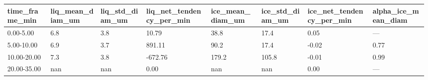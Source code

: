 \begin{tabular}{llllllll}
\toprule
time_frame_min & liq_mean_diam_um & liq_std_diam_um & liq_net_tendency_per_min & ice_mean_diam_um & ice_std_diam_um & ice_net_tendency_per_min & alpha_ice_mean_diam \\
\midrule
0.00-5.00 & 6.8 & 3.8 & 10.79 & 38.8 & 17.4 & 0.05 & — \\
5.00-10.00 & 6.9 & 3.7 & 891.11 & 90.2 & 17.4 & -0.02 & 0.77 \\
10.00-20.00 & 7.3 & 3.8 & -672.76 & 179.2 & 105.8 & -0.01 & 0.99 \\
20.00-35.00 & nan & nan & 0.00 & nan & nan & 0.00 & — \\
\bottomrule
\end{tabular}
